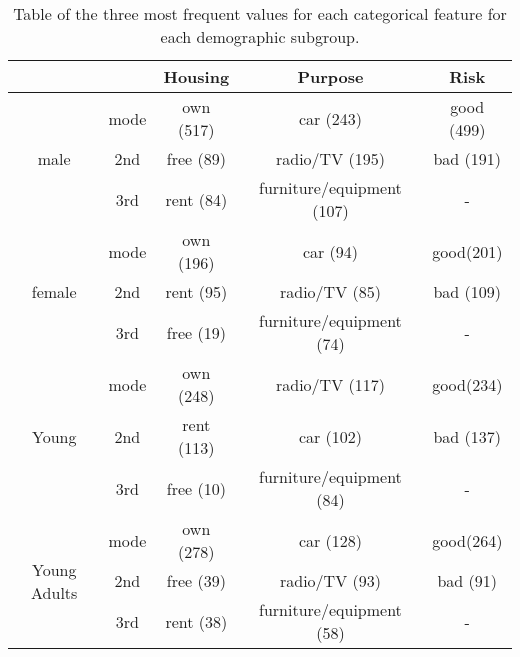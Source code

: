 \documentclass[conference]{IEEEtran}
\begin{document}

\begin{table}[ht]
    \begin{center}
    \caption{Table of the three most frequent values for each categorical feature for each demographic subgroup.}
    \begin{tabular}{|c|c|c|c|c|} 
        \hline
        & & Housing & Purpose & Risk \\ 
        \hline
        \multirow{3}{*}{male} 
        & mode              & own (517) & car (243) & good (499)\\ 
        & 2nd & free (89) & radio/TV (195) & bad (191)\\ 
        & 3rd & rent (84) & furniture/equipment (107) & - \\ 
        \hline
        \multirow{3}{*}{female} 
        & mode              & own (196) & car (94) & good(201) \\ 
        & 2nd & rent (95) & radio/TV (85) & bad (109) \\
        & 3rd & free (19) & furniture/equipment (74) & - \\ 
        \hline
        \multirow{3}{*}{Young} 
        & mode              & own (248)  & radio/TV (117) & good(234) \\ 
        & 2nd & rent (113) & car (102) & bad (137) \\
        & 3rd & free (10)  & furniture/equipment (84) & - \\ 
        \hline
        \multirow{3}{2em}{Young Adults} 
        & mode              & own (278) & car (128) & good(264) \\ 
        & 2nd & free (39) & radio/TV (93) & bad (91) \\
        & 3rd & rent (38) & furniture/equipment (58) & - \\

\end{tabular}
\end{center}
\end{table}
\end{document}
